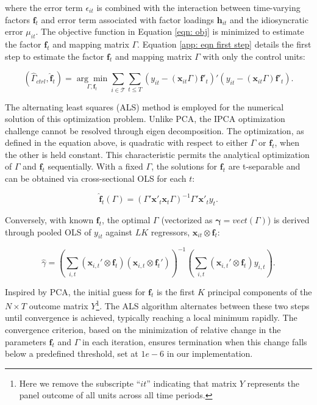 \documentclass[12pt]{article}
\begin{document}
where the error term $\epsilon_{it}$ is combined with the interaction between time-varying factors $\bm{f}_t$ and error term associated with factor loadings $\bm{h}_{it}$ and the idiosyncratic error $\mu_{it}$. The objective function in Equation \ref{eqn: obj} is minimized to estimate the factor $\bm{f}_t$ and mapping matrix $\Gamma$. Equation \ref{app: eqn first step} details the first step to estimate the factor $\bm{f}_t$ and mapping matrix $\Gamma$ with only the control units:

\begin{equation}
\label{app: eqn first step}
(\hat{\Gamma}_{ctrl}, \hat{\bm{f}}_t) = \underset{\Gamma, \bm{f}_t}{\arg\min} \sum_{i \in \mathcal{T}} \sum_{t \leq T} \left( y_{it} - (\bm{x}_{it}\Gamma) \bm{f}'_{t} \right)' \left( y_{it} - (\bm{x}_{it}\Gamma) \bm{f}'_{t} \right).
\end{equation}

The alternating least squares (ALS) method is employed for the numerical solution of this optimization problem. Unlike PCA, the IPCA optimization challenge cannot be resolved through eigen decomposition. The optimization, as defined in the equation above, is quadratic with respect to either $\Gamma$ or $\bm{f}_t$, when the other is held constant. This characteristic permits the analytical optimization of $\Gamma$ and $\bm{f}_t$ sequentially. With a fixed $\Gamma$, the solutions for $\bm{f}_t$ are t-separable and can be obtained via cross-sectional OLS for each $t$:

\begin{equation}
\label{app: eqn update f}
\hat{\bm{f}}_t(\Gamma) = (\Gamma' \bm{x}'_t \bm{x}_t \Gamma)^{-1} \Gamma' \bm{x}'_t y_t.
\end{equation}

Conversely, with known $\bm{f}_{t}$, the optimal $\Gamma$ (vectorized as $\bm{\gamma} = vect(\Gamma)$) is derived through pooled OLS of $y_{it}$ against $LK$ regressors, $\bm{x}_{it} \otimes \bm{f}_t$:

\begin{equation}
\label{app: eqn update gamma}
\hat{\gamma} = \left( \sum_{i,t} (\bm{x}_{i,t}' \otimes \bm{f}_t) (\bm{x}_{i,t} \otimes \bm{f}_t') \right)^{-1} \left( \sum_{i,t} (\bm{x}_{i,t}' \otimes \bm{f}_t) y_{i,t} \right).
\end{equation}

Inspired by PCA, the initial guess for $\bm{f}_t$ is the first $K$ principal components of the $N \times T$ outcome matrix $Y$\footnote{Here we remove the subscripte ``$it$'' indicating that matrix $Y$ represents the panel outcome of all units across all time periods.}. The ALS algorithm alternates between these two steps until convergence is achieved, typically reaching a local minimum rapidly. The convergence criterion, based on the minimization of relative change in the parameters $\bm{f}_t$ and $\Gamma$ in each iteration, ensures termination when this change falls below a predefined threshold, set at $1e-6$ in our implementation.
\end{document}
